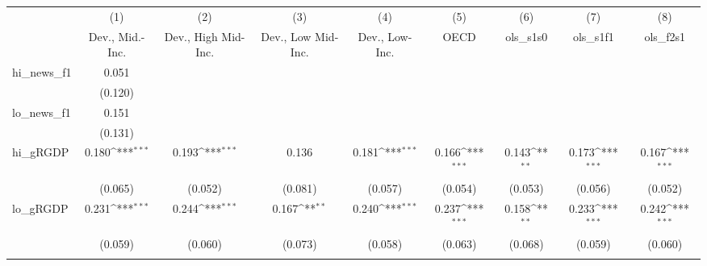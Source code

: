 {
\def\sym#1{\ifmmode^{#1}\else\(^{#1}\)\fi}
\begin{tabular}{l*{8}{c}}
\toprule
            &\multicolumn{1}{c}{(1)}&\multicolumn{1}{c}{(2)}&\multicolumn{1}{c}{(3)}&\multicolumn{1}{c}{(4)}&\multicolumn{1}{c}{(5)}&\multicolumn{1}{c}{(6)}&\multicolumn{1}{c}{(7)}&\multicolumn{1}{c}{(8)}\\
            &\multicolumn{1}{c}{Dev., Mid.-Inc.}&\multicolumn{1}{c}{Dev., High Mid-Inc.}&\multicolumn{1}{c}{Dev., Low Mid-Inc.}&\multicolumn{1}{c}{Dev., Low-Inc.}&\multicolumn{1}{c}{OECD}&\multicolumn{1}{c}{ols\_s1s0}&\multicolumn{1}{c}{ols\_s1f1}&\multicolumn{1}{c}{ols\_f2s1}\\
\midrule
hi\_news\_f1  &       0.051         &                     &                     &                     &                     &                     &                     &                     \\
            &     (0.120)         &                     &                     &                     &                     &                     &                     &                     \\
\addlinespace
lo\_news\_f1  &       0.151         &                     &                     &                     &                     &                     &                     &                     \\
            &     (0.131)         &                     &                     &                     &                     &                     &                     &                     \\
\addlinespace
hi\_gRGDP    &       0.180\sym{***}&       0.193\sym{***}&       0.136         &       0.181\sym{***}&       0.166\sym{***}&       0.143\sym{**} &       0.173\sym{***}&       0.167\sym{***}\\
            &     (0.065)         &     (0.052)         &     (0.081)         &     (0.057)         &     (0.054)         &     (0.053)         &     (0.056)         &     (0.052)         \\
\addlinespace
lo\_gRGDP    &       0.231\sym{***}&       0.244\sym{***}&       0.167\sym{**} &       0.240\sym{***}&       0.237\sym{***}&       0.158\sym{**} &       0.233\sym{***}&       0.242\sym{***}\\
            &     (0.059)         &     (0.060)         &     (0.073)         &     (0.058)         &     (0.063)         &     (0.068)         &     (0.059)         &     (0.060)         \\
\addlinespace

\end{tabular}}

